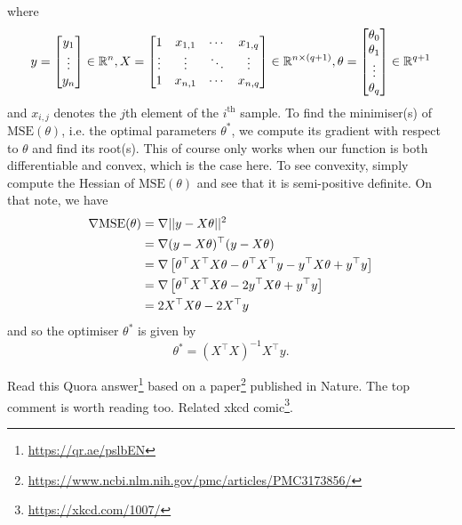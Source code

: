 \documentclass[11pt]{article}
\begin{document}
where
$$
y
=
\begin{bmatrix}
    y_1\\
    \vdots\\
    y_n
\end{bmatrix}
\in\mathbb{R}^n,
X
=
\begin{bmatrix}
    1 & x_{1,1} & \cdots & x_{1,q}\\
    \vdots & \vdots & \ddots & \vdots\\
    1 & x_{n,1} & \cdots & x_{n,q}
\end{bmatrix}
\in\mathbb{R}^{n\times (q+1)},
\theta
=
\begin{bmatrix}
    \theta_0\\
    \theta_1\\
    \vdots\\
    \theta_q
\end{bmatrix}
\in\mathbb{R}^{q+1}
$$
and $x_{i,j}$ denotes the $j$th element of the $i^{\text{th}}$ sample. To find the minimiser(s) of $\text{MSE}(\theta)$, i.e. the optimal parameters $\theta^{*}$, we compute its gradient with respect to $\theta$ and find its root(s). This of course only works when our function is both differentiable and convex, which is the case here. To see convexity, simply compute the Hessian of $\text{MSE}(\theta)$ and see that it is semi-positive definite. On that note, we have
\begin{align*}
    \nabla\text{MSE}(\theta)
    &=
    \nabla||y-X\theta||^2\\
    &=
    \nabla(y-X\theta)^{\top}(y-X\theta)\\
    &=
    \nabla\left[\theta^{\top}X^{\top}X\theta-\theta^{\top}X^{\top}y-y^{\top}X\theta+y^{\top}y\right]\\
    &=
    \nabla\left[\theta^{\top}X^{\top}X\theta-2y^{\top}X\theta+y^{\top}y\right]\\
    &=
    2X^{\top}X\theta-2X^{\top}y
\end{align*}
and so the optimiser $\theta^{*}$ is given by
$$
\theta^{*}=(X^{\top}X)^{-1}X^{\top}y.
$$

\begin{tcolorbox}[title={\textbf{Funny misuse of linear regression: Momentous sprint at the 2156 Olympics?}}, colback=myLightBlue, colbacktitle=myDarkBlue, colframe=myDarkBlue, coltitle=white]
    Read this Quora answer\footnote{\url{https://qr.ae/pslbEN}} based on a paper\footnote{\url{https://www.ncbi.nlm.nih.gov/pmc/articles/PMC3173856/}} published in Nature. The top comment is worth reading too. Related xkcd comic\footnote{\url{https://xkcd.com/1007/}}.
\end{tcolorbox}
\end{document}

